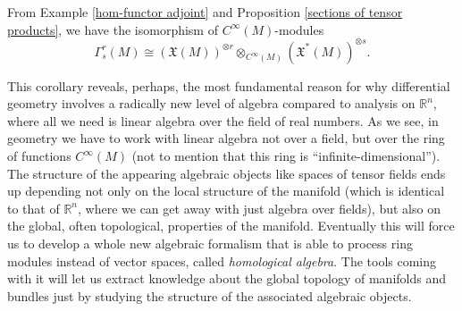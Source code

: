 \documentclass[english,letterpaper]{article}%
\numberwithin{equation}{section}
\numberwithin{figure}{section}
\numberwithin{table}{section}
\theoremstyle{definition}
\theoremstyle{definition}
\theoremstyle{definition}
\theoremstyle{plain}
\theoremstyle{plain}
\theoremstyle{plain}
\theoremstyle{plain}
\theoremstyle{remark}
\theoremstyle{remark}
\newcommand{\fX}{\mathfrak{X}}
\begin{document}
\begin{cor}
    From Example \ref{hom-functor adjoint} and Proposition \ref{sections of tensor products}, we have the isomorphism of $C^\infty(M)$-modules
    \[\Gamma^r_s (M)\cong \left(\fX(M)\right)^{\otimes r} \otimes_{C^\infty(M)}\left(\fX^\ast(M)\right)^{\otimes s}.\]
\end{cor}

\begin{rem}
    This corollary reveals, perhaps, the most fundamental reason for why differential geometry involves a radically new level of algebra compared to analysis on $\mathbb{R}^n$, where all we need is linear algebra over the field of real numbers. As we see, in geometry we have to work with linear algebra not over a field, but over the ring of functions $C^\infty(M)$ (not to mention that this ring is ``infinite-dimensional''). The structure of the appearing algebraic objects like spaces of tensor fields ends up depending not only on the local structure of the manifold (which is identical to that of $\mathbb{R}^n$, where we can get away with just algebra over fields), but also on the global, often topological, properties of the manifold. Eventually this will force us to develop a whole new algebraic formalism that is able to process ring modules instead of vector spaces, called \emph{homological algebra}. The tools coming with it will let us extract knowledge about the global topology of manifolds and bundles just by studying the structure of the associated algebraic objects.
\end{rem}
\end{document}
